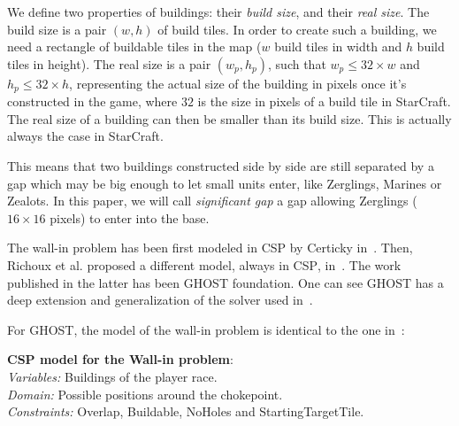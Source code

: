 \documentclass[journal]{IEEEtran}
\newcommand{\csp}{\textsc{CSP}\xspace}
\newcommand{\ghost}{\textsc{GHOST}\xspace}
\newcommand{\modelcsp}[4]%
{ \begin{trivlist}
  \item[]%
    \textbf{CSP model for #1}:\\
    \textit{Variables:} #2\\
    \textit{Domain:} #3\\
    \textit{Constraints:} #4
  \end{trivlist}%
}
\begin{document}
We define  two properties  of buildings: their  {\em build  size}, and
their {\em  real size}.  The  build size is a  pair $(w, h)$  of build
tiles. In  order to  create such  a building, we  need a  rectangle of
buildable tiles  in the map  ($w$ build tiles  in width and  $h$ build
tiles in height). The real size is a pair $(w_p, h_p)$, such that $w_p
\leq 32 \times w$ and $h_p  \leq 32 \times h$, representing the actual
size of  the building  in pixels  once it's  constructed in  the game,
where $32$  is the size  in pixels of a  build tile in  StarCraft. The
real size of a building can then  be smaller than its build size. This
is actually always the case in StarCraft.

This  means that  two buildings  constructed  side by  side are  still
separated by a gap  which may be big enough to  let small units enter,
like Zerglings, Marines  or Zealots. In this paper, we  will call {\it
  significant gap} a gap allowing Zerglings ($16 \times 16$ pixels) to
enter into the base.

The  wall-in  problem has  been  first  modeled  in \csp  by  Certicky
in~\cite{Certicky13}. Then, Richoux et al. proposed a different model,
always  in \csp,  in~\cite{RichouxUO14}.   The work  published in  the
latter has  been \ghost  foundation.  One  can see  \ghost has  a deep
extension and generalization of the solver used in~\cite{RichouxUO14}.

For \ghost, the  model of the wall-in problem is  identical to the one
in~\cite{RichouxUO14}:
\modelcsp{the Wall-in problem}%
{Buildings of the player race.}%
{Possible positions around the chokepoint.}%
{Overlap, Buildable, NoHoles and StartingTargetTile.}
\end{document}

